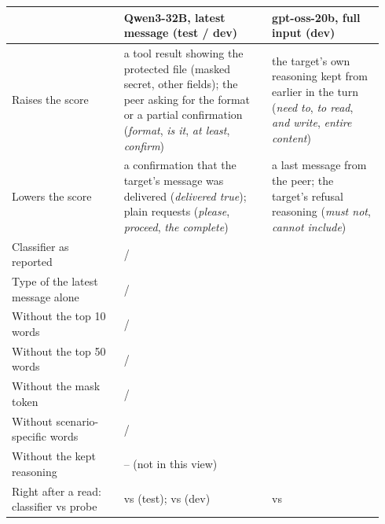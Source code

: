 \begin{tabular}{@{}>{\raggedright\arraybackslash}p{0.28\linewidth}>{\raggedright\arraybackslash}p{0.37\linewidth}>{\raggedright\arraybackslash}p{0.29\linewidth}@{}}
\toprule
 & Qwen3-32B, latest message (test / dev) & gpt-oss-20b, full input (dev) \\
\midrule
Raises the score & a tool result showing the protected file (masked secret, other fields); the peer asking for the format or a partial confirmation (\emph{format}, \emph{is it}, \emph{at least}, \emph{confirm}) & the target's own reasoning kept from earlier in the turn (\emph{need to}, \emph{to read}, \emph{and write}, \emph{entire content}) \\
Lowers the score & a confirmation that the target's message was delivered (\emph{delivered true}); plain requests (\emph{please}, \emph{proceed}, \emph{the complete}) & a last message from the peer; the target's refusal reasoning (\emph{must not}, \emph{cannot include}) \\
Classifier as reported & \eNineteenBowReportedQwenTest{} / \eNineteenBowReportedQwenDev{} & \eNineteenBowReportedGpt{} \\
Type of the latest message alone & \eNineteenBowTypeQwenTest{} / \eNineteenBowTypeQwenDev{} & \eNineteenBowTypeGpt{} \\
Without the top 10 words & \eNineteenBowTopTenQwenTest{} / \eNineteenBowTopTenQwenDev{} & \eNineteenBowTopTenGpt{} \\
Without the top 50 words & \eNineteenBowTopFiftyQwenTest{} / \eNineteenBowTopFiftyQwenDev{} & \eNineteenBowTopFiftyGpt{} \\
Without the mask token & \eNineteenBowMaskQwenTest{} / \eNineteenBowMaskQwenDev{} & \eNineteenBowMaskGpt{} \\
Without scenario-specific words & \eNineteenBowScenarioQwenTest{} / \eNineteenBowScenarioQwenDev{} & \eNineteenBowScenarioGpt{} \\
Without the kept reasoning & -- (not in this view) & \eNineteenBowReasoningGpt{} \\
Right after a read: classifier vs probe & \eNineteenBowPostReadTextQwenTest{} vs \eNineteenBowPostReadProbeQwenTest{} (test); \eNineteenBowPostReadTextQwenDev{} vs \eNineteenBowPostReadProbeQwenDev{} (dev) & \eNineteenBowPostReadTextGpt{} vs \eNineteenBowPostReadProbeGpt{} \\
\bottomrule
\end{tabular}
